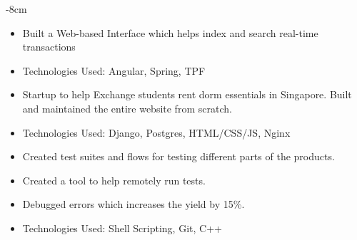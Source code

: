 \documentclass[10pt,a4paper]{altacv}
\begin{document}

\begin{adjustwidth}{}{-8cm}
\makecvheader
\end{adjustwidth}


\begin{itemize}
\item Built a Web-based Interface which helps index and search real-time transactions
\item Technologies Used: Angular, Spring, TPF
\end{itemize}
\divider

\begin{itemize}
\item Startup to help Exchange students rent dorm essentials in Singapore. Built and maintained the entire website from scratch.
\item Technologies Used: Django, Postgres, HTML/CSS/JS, Nginx
\end{itemize}

\divider

\begin{itemize}
\item Created test suites and flows for testing different parts of the products. 
\item Created a tool to help remotely run tests.
\item Debugged errors which increases the yield by 15\%.
\item Technologies Used: Shell Scripting, Git, C++
\end{itemize}
\end{document}
